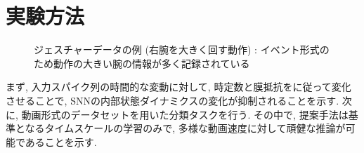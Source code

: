 \section{実験方法}

\begin{figure*}[t]
    \centering
    \parbox{.9\linewidth}{
        \centering
        
        \caption{ジェスチャーデータの例 (右腕を大きく回す動作) : イベント形式のため動作の大きい腕の情報が多く記録されている}
        \label{sec3:fig:gesture}
    }

\end{figure*}

まず, 入力スパイク列の時間的な変動に対して, 時定数と膜抵抗をに従って変化させることで, SNNの内部状態ダイナミクスの変化が抑制されることを示す.
次に, 動画形式のデータセットを用いた分類タスクを行う.
その中で, 提案手法は基準となるタイムスケールの学習のみで, 多様な動画速度に対して頑健な推論が可能であることを示す.




% 
